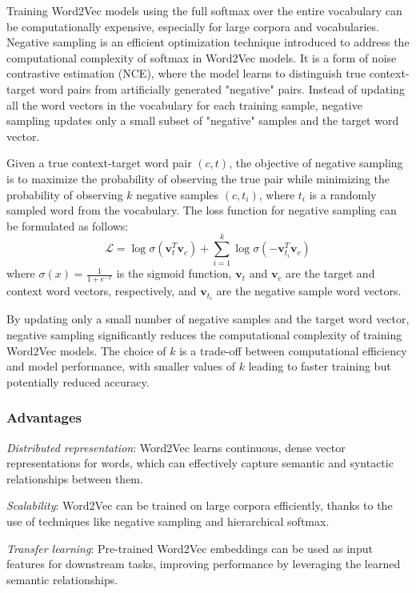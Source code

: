 \documentclass[12pt]{article}
\begin{document}
Training Word2Vec models using the full softmax over the entire vocabulary can be computationally expensive, especially for large corpora and vocabularies. Negative sampling is an efficient optimization technique introduced to address the computational complexity of softmax in Word2Vec models. It is a form of noise contrastive estimation (NCE), where the model learns to distinguish true context-target word pairs from artificially generated "negative" pairs. Instead of updating all the word vectors in the vocabulary for each training sample, negative sampling updates only a small subset of "negative" samples and the target word vector.

Given a true context-target word pair $(c, t)$, the objective of negative sampling is to maximize the probability of observing the true pair while minimizing the probability of observing $k$ negative samples $(c, t_i)$, where $t_i$ is a randomly sampled word from the vocabulary. The loss function for negative sampling can be formulated as follows:
\begin{equation}
\mathcal{L} = \log \sigma(\mathbf{v}_t^T \mathbf{v}_c) + \sum_{i=1}^{k} \log \sigma(-\mathbf{v}_{t_i}^T \mathbf{v}_c)
\end{equation}
where $\sigma(x) = \frac{1}{1 + e^{-x}}$ is the sigmoid function, $\mathbf{v}_t$ and $\mathbf{v}_c$ are the target and context word vectors, respectively, and $\mathbf{v}_{t_i}$ are the negative sample word vectors.

By updating only a small number of negative samples and the target word vector, negative sampling significantly reduces the computational complexity of training Word2Vec models. The choice of $k$ is a trade-off between computational efficiency and model performance, with smaller values of $k$ leading to faster training but potentially reduced accuracy.

\subsubsection{Advantages}
\textit{Distributed representation}: Word2Vec learns continuous, dense vector representations for words, which can effectively capture semantic and syntactic relationships between them.

\textit{Scalability}: Word2Vec can be trained on large corpora efficiently, thanks to the use of techniques like negative sampling and hierarchical softmax.

\textit{Transfer learning}: Pre-trained Word2Vec embeddings can be used as input features for downstream tasks, improving performance by leveraging the learned semantic relationships.
\end{document}
